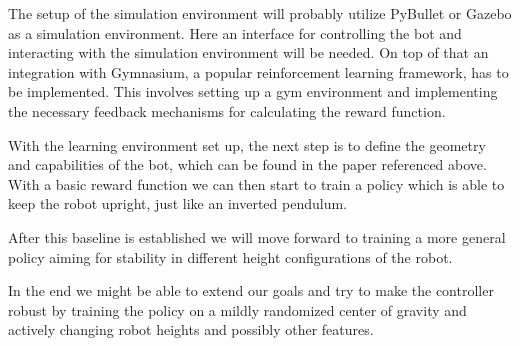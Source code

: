 \documentclass[a4paper]{article}
\begin{document}
The setup of the simulation environment will probably utilize PyBullet or Gazebo as a simulation
environment. Here an interface for controlling the bot and interacting with the simulation environment
will be needed. On top of that an integration with Gymnasium, a popular reinforcement learning
framework, has to be implemented. This involves setting up a gym environment and implementing the necessary
feedback mechanisms for calculating the reward function.

With the learning environment set up, the next step is to define the geometry and capabilities of the
bot, which can be found in the paper referenced above. With a basic reward function we can then start
to train a policy which is able to keep the robot upright, just like an inverted pendulum.

After this baseline is established we will move forward to training a more general policy aiming for
stability in different height configurations of the robot.

In the end we might be able to extend our goals and try to make the controller robust by training
the policy on a mildly randomized center of gravity and actively changing robot heights and possibly
other features.
\end{document}
